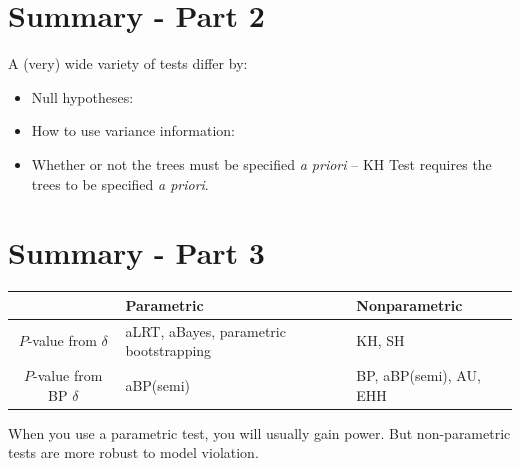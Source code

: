 \documentclass[landscape]{foils}
\begin{document}
\myNewSlide
\section*{Summary - Part 2}
\normalsize
A (very) wide variety of tests differ by:
\begin{itemize}
	\item Null hypotheses:
	\item How to use variance information:
	\item Whether or not the trees must be specified {\em a priori} -- KH Test requires the trees to be specified {\em a priori}.
\end{itemize}

\myNewSlide
\section*{Summary - Part 3}
\large
\begin{table}[htdp]
\begin{center}
\begin{tabular}{|c|p{7cm}|p{6cm}|}
\hline
& Parametric & Nonparametric \\
\hline
$P$-value from $\delta$  & aLRT, aBayes, parametric bootstrapping & KH, SH \\
\hline
$P$-value from BP $\delta$  &aBP(semi)  & BP, aBP(semi), AU, EHH\\
\hline
\end{tabular}
\end{center}
\label{default}
\end{table}%

When you use a parametric test, you will usually gain power. But non-parametric tests are more robust to model violation.



\myNewSlide
\normalsize


 
\end{document}
